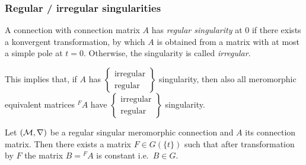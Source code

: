 \subsubsection{Regular / irregular singularities}
\begin{comment}
  see \cite[defn.5.1.6]{hotta2008}
\end{comment}
\begin{defn}
  A connection with connection matrix $A$ has \emph{regular singularity} at $0$
  if there exists a konvergent transformation, by which $A$ is obtained from a
  matrix with at most a simple pole at $t=0$.
  Otherwise, the singularity is called \emph{irregular}.
  \begin{s-rem}
    This implies that, if $A$ has
    $\left\{\substack{\text{irregular}\\\text{regular}}\right\}$
    singularity, then also all
    meromorphic equivalent matrices ${}^{F}\!A$ have
    $\left\{\substack{\text{irregular}\\\text{regular}}\right\}$
    singularity.
  \end{s-rem}
\end{defn}
\begin{comment}
  \begin{rem}
    \marginnote{\cite[150]{van2003galois}}
    One can express this notion of regular singular also in terms of
    $\delta:=t\frac{d}{dt}$. A system has regular singularity if it is
    equivalent to an equation $\delta-A$ where $A$ has entries in  holomorphic
    functions in a neighbourhood of $z=0$.
  \end{rem}
\end{comment}
\begin{thm}
  \begin{comment}
    see
    \begin{itemize}
      \item \cite[Thm.II.2.8]{sabbah2007isomonodromic}
      \item \cite[5.1.2]{hotta2008}
    \end{itemize}
  \end{comment}
  Let $(\mathcal{M},\nabla)$ be a regular singular meromorphic connection and $A$ its
  connection matrix.
  Then there exists a matrix $F\in G(\!\{t\}\!)$ such that after transformation
  by $F$ the matrix $B={}^F\!A$ is constant i.e.\ $B\in G$.
\end{thm}

